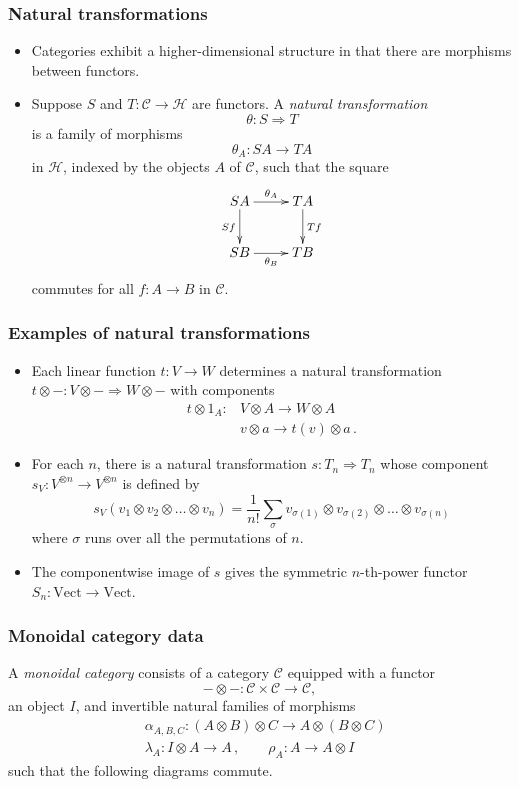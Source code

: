 \documentclass{beamer}
\newcommand{\lra}{\longrightarrow}
\newcommand{\Lra}{\Longrightarrow}
\def\CC{{\mathscr C}}
\def\CH{{\mathscr H}}
\begin{document}
\begin{frame}
  \frametitle{Natural transformations}
\begin{itemize}
\item Categories exhibit a higher-dimensional structure in that there are morphisms between functors.
\pause
\item Suppose $S$ and $T : \CC \lra \CH$ are functors. A \emph{natural transformation}
\[
\theta : S \Longrightarrow T
\]
is a family of morphisms
\[
\theta_A : SA \lra TA
\]
in $\CH$, indexed by the objects $A$ of $\CC$, such that the square
\[
\xymatrix{
   S A \ar[r]^{\theta_A} \ar[d]_{Sf}   & TA  \ar[d]^{Tf}\\
    SB \ar[r]_{\theta_B}    & TB}
\]
commutes for all $f : A \lra B$ in $\CC$.
\end{itemize}
\end{frame}
\begin{frame}
  \frametitle{Examples of natural transformations}
\begin{itemize}
\item Each linear function $t : V \lra W$ determines a natural transformation 
$t \otimes - : V \otimes - \Lra W \otimes -$ with components
\begin{align*}
  t \otimes 1_A : &V \otimes A \lra W \otimes A \\
 & v \otimes a \lra t(v) \otimes a\,. 
\end{align*}
\pause
\item For each $n$, there is a natural transformation $s: T_n \Longrightarrow T_n$ 
whose component $s_V : V^{\otimes n}\lra V^{\otimes n}$ is defined by
$$s_V(v_1\otimes v_2 \otimes \dots \otimes v_n) = \frac{1}{n!} \sum_{\sigma} v_{\sigma(1)}\otimes v_{\sigma(2)} \otimes \dots \otimes v_{\sigma(n)}$$
where $\sigma$ runs over all the permutations of $n$. 
\pause
\item The componentwise image of $s$ gives the symmetric $n$-th-power functor $S_n : \mathrm{Vect}  \lra \mathrm{Vect}$.   
\end{itemize}
\end{frame}
\begin{frame}
  \frametitle{Monoidal category data}
A \emph{monoidal category} consists of a category $\CC$ equipped with a functor
\[
- \otimes - : \CC \times \CC \lra \CC,
\]
an object $I$, and invertible natural families of morphisms
\begin{align*}
 & \alpha^{}_{A,B,C} : (A \otimes B) \otimes C \lra A \otimes (B \otimes C)\\
 & \lambda_A : I \otimes A \lra A\,, \qquad \rho_A : A  \lra A\otimes I
\end{align*}
such that the following diagrams commute.
\end{frame}
\end{document}
